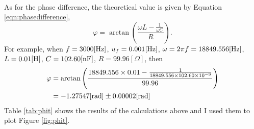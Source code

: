 \documentclass{my_template}
\renewcommand{\phi}{\varphi}
\begin{document}
    \paragraph{} As for the phase difference, the theoretical value is given by Equation \ref{eqn:phasedifference}, $$\phi=\arctan\left(\frac{\omega L-\frac{1}{\omega C}}{R}\right).$$ For example, when $f=3000[\rm Hz]$, $u_f=0.001[\rm Hz]$, $\omega=2\pi f=18849.556[\rm Hz]$, $L=0.01[\rm H]$, $C=102.60[\rm nF]$, $R=99.96[\Omega]$, then 
    \begin{equation*}
        \begin{split}
            \phi&=\arctan\left(\frac{18849.556\times 0.01-\frac{1}{18849.556\times 102.60\times 10^{-9}}}{99.96}\right)\\
            &=-1.27547[\rm rad]\pm 0.00002[rad]
        \end{split}
    \end{equation*}
    Table \ref{tab:phit} shows the results of the calculations above and I used them to plot Figure \ref{fig:phit}.
\end{document}
